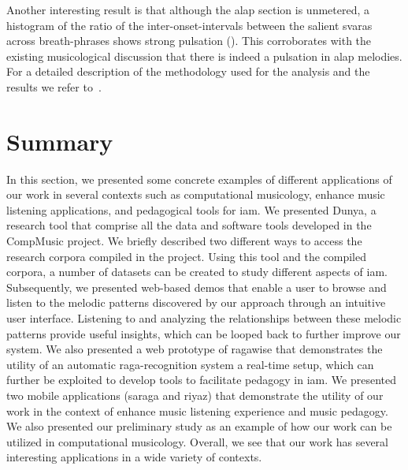 Another interesting result is that although the \gls{alap} section is unmetered, a histogram of the ratio of the inter-onset-intervals between the salient \glspl{svara} across breath-phrases shows strong pulsation (). This corroborates with the existing musicological discussion that there is indeed a pulsation in \gls{alap} melodies. For a detailed description of the methodology used for the analysis and the results we refer to~\cite{kaustuv_ismir_2016}.

\section{Summary}
\label{sec:applications_summary}

In this section, we presented some concrete examples of different applications of our work in several contexts such as computational musicology, enhance music listening applications, and pedagogical tools for \gls{iam}. We presented Dunya, a research tool that comprise all the data and software tools developed in the CompMusic project. We briefly described two different ways to access the research corpora compiled in the project. Using this tool and the compiled corpora, a number of datasets can be created to study different aspects of \gls{iam}. Subsequently, we presented web-based demos that enable a user to browse and listen to the melodic patterns discovered by our approach through an intuitive user interface. Listening to and analyzing the relationships between these melodic patterns provide useful insights, which can be looped back to further improve our system. We also presented a web prototype of \gls{ragawise} that demonstrates the utility of an automatic raga-recognition system a real-time setup, which can further be exploited to develop tools to facilitate pedagogy in \gls{iam}. We presented two mobile applications (\gls{saraga} and \gls{riyaz}) that demonstrate the utility of our work in the context of enhance music listening experience and music pedagogy. We also presented our preliminary study as an example of how our work can be utilized in computational musicology. Overall, we see that our work has several interesting applications in a wide variety of contexts.

